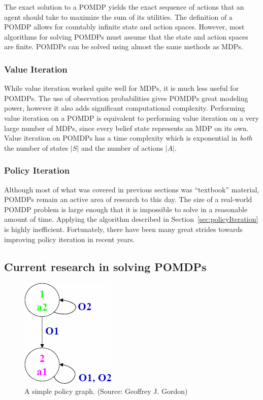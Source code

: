 \documentclass[tog]{acmsiggraph}
\begin{document}
The exact solution to a POMDP yields the exact sequence of actions that an agent should take 
to maximize the sum of its utilities. The definition of a POMDP allows for countably infinite 
state and action spaces. However, most algorithms for solving POMDPs must assume that the 
state and action spaces are finite. POMDPs can be solved using almost the same methods as MDPs.

\subsubsection{Value Iteration}
While value iteration worked quite well for MDPs, it is much less useful for POMDPs. The use of 
observation probabilities gives POMDPs great modeling power, however it also adds significant 
computational complexity. Performing value iteration on a POMDP is equivalent to performing value 
iteration on a very large number of MDPs, since every belief state represents an MDP on its own. 
Value iteration on POMDPs has a time complexity which is exponential in \textit{both} the number 
of states $|S|$ and the number of actions $|A|$.

\subsubsection{Policy Iteration}
Although most of what was covered in previous sections was ``textbook'' material, POMDPs remain 
an active area of research to this day. The size of a real-world POMDP problem is large enough 
that it is impossible to solve in a reasonable amount of time. Applying the algorithm described 
in Section~\ref{sec:policyIteration} is highly inefficient. Fortunately, there have been many 
great strides towards improving policy iteration in recent years.

\subsection{Current research in solving POMDPs}

\begin{figure}[h]
  \centering
  \def\svgwidth{\columnwidth}
  \includegraphics[scale=0.5]{state_controller.png}
  \caption{A simple policy graph. (Source: Geoffrey J. Gordon)}
  \label{fig:state_controller}
\end{figure}
\end{document}
